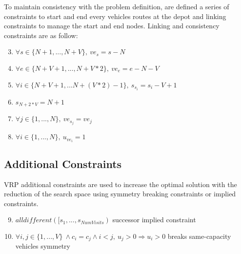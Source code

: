 To maintain consistency with the problem definition, are defined a series of constraints to start and end every vehicles routes at the depot and linking constraints to manage the start and end nodes.\newline
Linking and consistency constraints are as follow:
\begin{enumerate}
 \setcounter{enumi}{2}
    \item \begin{math}\forall s \in \{N+1, ..., N + V\},\: ve_{s} = s - N\end{math}
    \item \begin{math}\forall e \in \{N + V + 1, ..., N + V * 2\}, \:ve_{e} = e - N - V\end{math}
    \item \begin{math}\forall i \in \{N + V + 1,...N + (V * 2) - 1\}, \:s_{s_{i}} = s_{i} - V + 1 \end{math}
    \item \begin{math}s_{N + 2 * V} = N + 1\end{math}
    \item \begin{math}\forall j \in \{1,..., N\}, \:ve_{s_{j}} = ve_{j}\end{math}
    \item \begin{math}\forall i \in \{1,...,N\},\:u_{ve_{i}} = 1 \end{math}
\end{enumerate}
\subsection{Additional Constraints}
VRP additional constraints are used to increase the optimal solution with the reduction of the search space using symmetry breaking constraints or implied constraints.

\begin{enumerate}
 \setcounter{enumi}{8}
    \item \begin{math}alldifferent([s_{1},...,s_{NumVisits})\end{math} successor implied constraint
    \item \begin{math}\forall i,j \in \{1,...,V\} \: \land c_{i} = c_{j} \land i < j,\: u_{j} > 0 \Rightarrow u_{i} > 0\end{math} breaks same-capacity vehicles symmetry
\end{enumerate}
\newpage
